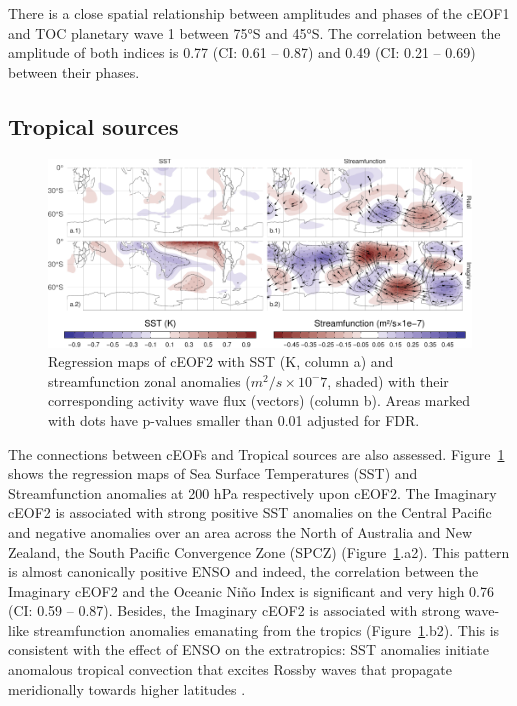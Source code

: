 \documentclass[smallextended]{svjour3}       %
\begin{document}
There is a close spatial relationship between amplitudes and phases of the cEOF1 and TOC planetary wave 1 between 75°S and 45°S.
The correlation between the amplitude of both indices is 0.77 (CI: 0.61 -- 0.87) and 0.49 (CI: 0.21 -- 0.69) between their phases.

\hypertarget{tropical}{%
\subsection{Tropical sources}\label{tropical}}



\begin{figure}
\includegraphics{../figures/sst-psi-2-1} \caption{Regression maps of cEOF2 with SST (K, column a) and streamfunction zonal anomalies (\(m^2/s\times10^-7\), shaded) with their corresponding activity wave flux (vectors) (column b). Areas marked with dots have p-values smaller than 0.01 adjusted for FDR.}\label{fig:sst-psi-2}
\end{figure}

The connections between cEOFs and Tropical sources are also assessed.
Figure~\ref{fig:sst-psi-2} shows the regression maps of Sea Surface Temperatures (SST) and Streamfunction anomalies at 200 hPa respectively upon cEOF2. The Imaginary cEOF2 is associated with strong positive SST anomalies on the Central Pacific and negative anomalies over an area across the North of Australia and New Zealand, the South Pacific Convergence Zone (SPCZ) (Figure~\ref{fig:sst-psi-2}.a2). This pattern is almost canonically positive ENSO \citep{bamston1997} and indeed, the correlation between the Imaginary cEOF2 and the Oceanic Niño Index \citep{bamston1997} is significant and very high 0.76 (CI: 0.59 -- 0.87).
Besides, the Imaginary cEOF2 is associated with strong wave-like streamfunction anomalies emanating from the tropics (Figure~\ref{fig:sst-psi-2}.b2). This is consistent with the effect of ENSO on the extratropics: SST anomalies initiate anomalous tropical convection that excites Rossby waves that propagate meridionally towards higher latitudes \citep{mo2000}.
\end{document}
